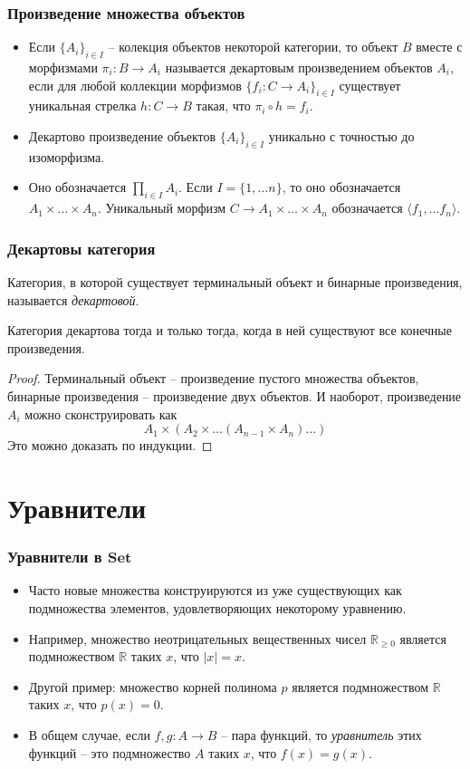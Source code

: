\documentclass{beamer}
\theoremstyle{definition}
\newcommand{\cat}[1]{\mathbf{#1}}
\newcommand{\Set}{\cat{Set}}
\begin{document}
\begin{frame}
\frametitle{Произведение множества объектов}
\begin{itemize}
\item Если $\{ A_i \}_{i \in I}$ -- колекция объектов некоторой категории, то объект $B$ вместе с морфизмами $\pi_i : B \to A_i$ называется декартовым произведением объектов $A_i$, если для любой коллекции морфизмов $\{ f_i : C \to A_i \}_{i \in I}$ существует уникальная стрелка $h : C \to B$ такая, что $\pi_i \circ h = f_i$.
\item Декартово произведение объектов $\{ A_i \}_{i \in I}$ уникально с точностью до изоморфизма.
\item Оно обозначается $\prod\limits_{i \in I} A_i$.
Если $I = \{ 1, \ldots n \}$, то оно обозначается $A_1 \times \ldots \times A_n$.
Уникальный морфизм $C \to A_1 \times \ldots \times A_n$ обозначается $\langle f_1, \ldots f_n \rangle$.
\end{itemize}
\end{frame}

\begin{frame}
\frametitle{Декартовы категория}
Категория, в которой существует терминальный объект и бинарные произведения, называется \emph{декартовой}.

\begin{prop}
Категория декартова тогда и только тогда, когда в ней существуют все конечные произведения.
\end{prop}
\begin{proof}
Терминальный объект -- произведение пустого множества объектов, бинарные произведения -- произведение двух объектов.
И наоборот, произведение $A_i$ можно сконструировать как
\[ A_1 \times (A_2 \times \ldots (A_{n-1} \times A_n) \ldots) \]
Это можно доказать по индукции.
\end{proof}
\end{frame}

\section{Уравнители}

\begin{frame}
\frametitle{Уравнители в $\Set$}
\begin{itemize}
\item Часто новые множества конструируются из уже существующих как подмножества элементов, удовлетворяющих некоторому уравнению.
\item Например, множество неотрицательных вещественных чисел $\mathbb{R}_{\geq 0}$ является подмножеством $\mathbb{R}$ таких $x$, что $|x| = x$.
\item Другой пример: множество корней полинома $p$ является подмножеством $\mathbb{R}$ таких $x$, что $p(x) = 0$.
\item В общем случае, если $f, g : A \to B$ -- пара функций, то \emph{уравнитель} этих функций -- это подмножество $A$ таких $x$, что $f(x) = g(x)$.
\end{itemize}
\end{frame}
\end{document}
